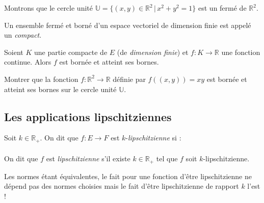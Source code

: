 \documentclass[french,11pt,twoside]{VcCours}
\begin{document}
\begin{Exemple} Montrons que le cercle unité $\mathbb{U} = \lbrace (x,y) \in \mathbb{R}^2 \, \vert \, x^2+y^2=1 \rbrace$ est un fermé de $\mathbb{R}^2$.

\vspace*{4cm}

%
\end{Exemple}

\begin{Definition}{} Un ensemble fermé et borné d'un espace vectoriel de dimension finie est appelé un \emph{compact}.
\end{Definition}

\begin{Theoreme}{} Soient $K$ une partie compacte de $E$ (de \emph{dimension finie}) et $f : K \rightarrow \mathbb{R}$ une fonction continue. Alors $f$ est bornée et atteint ses bornes.
\end{Theoreme}

\medskip


\begin{ApplicationDirecte}{} Montrer que la fonction $f : \mathbb{R}^2 \rightarrow \mathbb{R}$ définie par $f((x,y))= xy$ est bornée et atteint ses bornes sur le cercle unité $\mathbb{U}$.
\end{ApplicationDirecte}

\subsection{Les applications lipschitziennes}

\begin{Definition}{} Soit $k \in \mathbb{R}_+$. On dit que $f : E \rightarrow F$ est $k$-\emph{lipschitzienne} si :
$$ \phantom{\forall (x,y) \in E^2, \quad \Vert f(x)-f(y) \Vert_F \leq k \Vert x-y \Vert_E}$$
On dit que $f$ est \emph{lipschitzienne} s'il existe $k \in \mathbb{R}_+$ tel que $f$ soit $k$-lipschitzienne.
\end{Definition}

\begin{Remarque}[\alerte]{} Les normes étant équivalentes, le fait pour une fonction d'être lipschitzienne ne dépend pas des normes choisies mais le fait d'être lipschitzienne de rapport $k$ l'est !
\end{Remarque}
\end{document}
